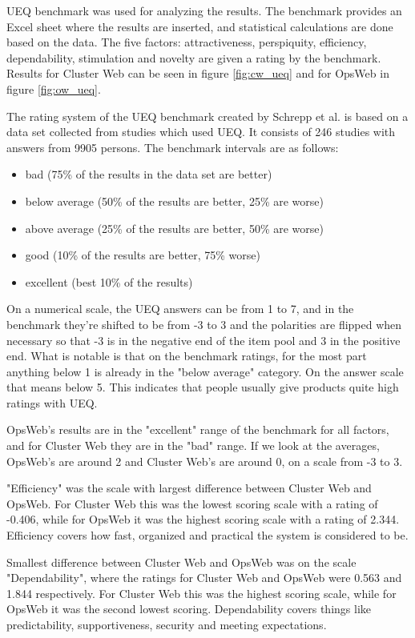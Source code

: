 UEQ benchmark \cite{schrepp2017construction} was used for analyzing the results. The benchmark provides an Excel sheet where the results are inserted, and statistical calculations are done based on the data. The five factors: attractiveness, perspiquity, efficiency, dependability, stimulation and novelty are given a rating by the benchmark. Results for Cluster Web can be seen in figure \ref{fig:cw_ueq} and for OpsWeb in figure \ref{fig:ow_ueq}.

The rating system of the UEQ benchmark created by Schrepp et al. is based on a data set collected from studies which used UEQ. It consists of 246 studies with answers from 9905 persons. The benchmark intervals are as follows:
\begin{itemize}
    \item bad (75\% of the results in the data set are better)
    \item below average (50\% of the results are better, 25\% are worse)
    \item above average (25\% of the results are better, 50\% are worse)
    \item good (10\% of the results are better, 75\% worse)
    \item excellent (best 10\% of the results)
\end{itemize}\cite{schrepp2017construction}

On a numerical scale, the UEQ answers can be from 1 to 7, and in the benchmark they're shifted to be from -3 to 3 and the polarities are flipped when necessary so that -3 is in the negative end of the item pool and 3 in the positive end. What is notable is that on the benchmark ratings, for the most part anything below 1 is already in the "below average" category. On the answer scale that means below 5. This indicates that people usually give products quite high ratings with UEQ.

OpsWeb's results are in the "excellent" range of the benchmark for all factors, and for Cluster Web they are in the "bad" range. If we look at the averages, OpsWeb's are around 2 and Cluster Web's are around 0, on a scale from -3 to 3. 

"Efficiency" was the scale with largest difference between Cluster Web and OpsWeb. For Cluster Web this was the lowest scoring scale with a rating of -0.406, while for OpsWeb it was the highest scoring scale with a rating of 2.344. Efficiency covers how fast, organized and practical the system is considered to be.

Smallest difference between Cluster Web and OpsWeb was on the scale "Dependability", where the ratings for Cluster Web and OpsWeb were 0.563 and 1.844 respectively. For Cluster Web this was the highest scoring scale, while for OpsWeb it was the second lowest scoring. Dependability covers things like predictability, supportiveness, security and meeting expectations.

